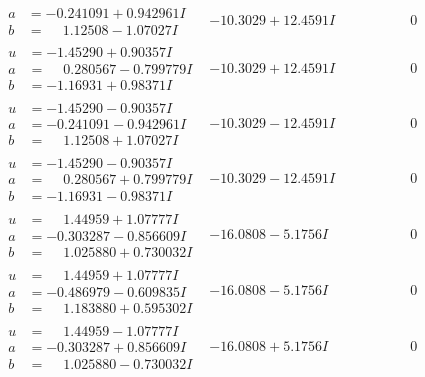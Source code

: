 \documentclass[1p]{elsarticle_modified}
\theoremstyle{definition}
\begin{document}
$$\begin{array}{c|c|c}
\begin{aligned}
a &= -0.241091 + 0.942961 I \\
b &= \phantom{-}1.12508 - 1.07027 I\end{aligned}
 & -10.3029 + 12.4591 I & \phantom{-0.000000 } 0 \\ \hline\begin{aligned}
u &= -1.45290 + 0.90357 I \\
a &= \phantom{-}0.280567 - 0.799779 I \\
b &= -1.16931 + 0.98371 I\end{aligned}
 & -10.3029 + 12.4591 I & \phantom{-0.000000 } 0 \\ \hline\begin{aligned}
u &= -1.45290 - 0.90357 I \\
a &= -0.241091 - 0.942961 I \\
b &= \phantom{-}1.12508 + 1.07027 I\end{aligned}
 & -10.3029 - 12.4591 I & \phantom{-0.000000 } 0 \\ \hline\begin{aligned}
u &= -1.45290 - 0.90357 I \\
a &= \phantom{-}0.280567 + 0.799779 I \\
b &= -1.16931 - 0.98371 I\end{aligned}
 & -10.3029 - 12.4591 I & \phantom{-0.000000 } 0 \\ \hline\begin{aligned}
u &= \phantom{-}1.44959 + 1.07777 I \\
a &= -0.303287 - 0.856609 I \\
b &= \phantom{-}1.025880 + 0.730032 I\end{aligned}
 & -16.0808 - 5.1756 I & \phantom{-0.000000 } 0 \\ \hline\begin{aligned}
u &= \phantom{-}1.44959 + 1.07777 I \\
a &= -0.486979 - 0.609835 I \\
b &= \phantom{-}1.183880 + 0.595302 I\end{aligned}
 & -16.0808 - 5.1756 I & \phantom{-0.000000 } 0 \\ \hline\begin{aligned}
u &= \phantom{-}1.44959 - 1.07777 I \\
a &= -0.303287 + 0.856609 I \\
b &= \phantom{-}1.025880 - 0.730032 I\end{aligned}
 & -16.0808 + 5.1756 I & \phantom{-0.000000 } 0 \\ \hline\begin{aligned}

\end{aligned}
\end{array}$$
\end{document}
